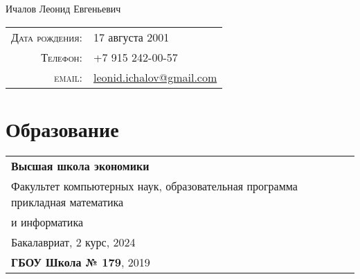 \documentclass[a4paper,11pt]{article}
\begin{document}


\pagestyle{empty} %


\par{\centering
		{\Huge Ичалов Леонид Евгеньевич
	}\bigskip\par}

\begin{center}
\hspace{0.7cm}\begin{tabular}{rl}
    \textsc{Дата рождения:} &  17 августа 2001 \\
    \textsc{Телефон:}     & +7 915 242-00-57\\
    \textsc{email:}     & \href{mailto:leonid.ichalov@gmail.com}{leonid.ichalov@gmail.com}
\end{tabular}
\end{center}
\section{Образование}

\vspace{5px}
\begin{tabular}{lr}
\textbf{\large Высшая школа экономики}\\
Факультет компьютерных наук, образовательная программа
прикладная математика\\\hspace{14.35cm} и информатика \\
\hspace{0.5cm}Бакалавриат, 2 курс, 2024\\

\textbf{ГБОУ Школа № 179}, 2019\\
\end{tabular}
\\
\end{document}

